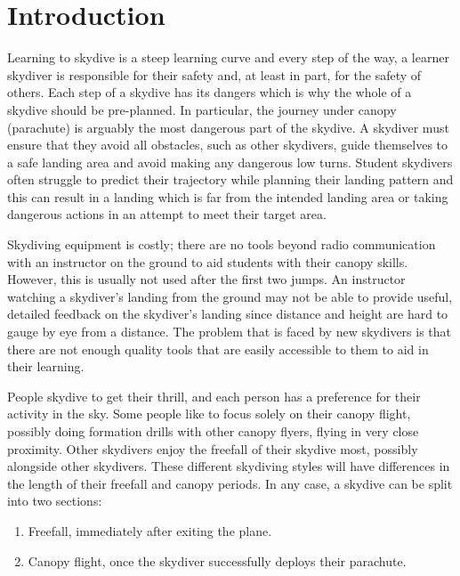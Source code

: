 \section{Introduction}\label{sec:introduction}
Learning to skydive is a steep learning curve and every step of the way, a learner skydiver is responsible for their safety and, at least in part, for the safety of others. Each step of a skydive has its dangers which is why the whole of a skydive should be pre-planned. In particular, the journey under canopy (parachute) is arguably the most dangerous part of the skydive. A skydiver must ensure that they avoid all obstacles, such as other skydivers, guide themselves to a safe landing area and avoid making any dangerous low turns. Student skydivers often struggle to predict their trajectory while planning their landing pattern and this can result in a landing which is far from the intended landing area or taking dangerous actions in an attempt to meet their target area.

Skydiving equipment is costly; there are no tools beyond radio communication with an instructor on the ground to aid students with their canopy skills. However, this is usually not used after the first two jumps. An instructor watching a skydiver's landing from the ground may not be able to provide useful, detailed feedback on the skydiver's landing since distance and height are hard to gauge by eye from a distance. The problem that is faced by new skydivers is that there are not enough quality tools that are easily accessible to them to aid in their learning.

People skydive to get their thrill, and each person has a preference for their activity in the sky. Some people like to focus solely on their canopy flight, possibly doing formation drills with other canopy flyers, flying in very close proximity. Other skydivers enjoy the freefall of their skydive most, possibly alongside other skydivers. These different skydiving styles will have differences in the length of their freefall and canopy periods.
In any case, a skydive can be split into two sections:
\begin{enumerate}
  \item Freefall, immediately after exiting the plane.
  \item Canopy flight, once the skydiver successfully deploys their parachute.
\end{enumerate}

